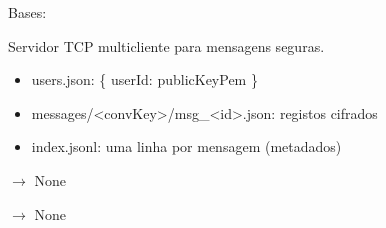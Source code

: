 \documentclass[letterpaper,10pt,english]{sphinxmanual}
\begin{document}
\begin{fulllineitems}
\label{\detokenize{modules:modules.messaging.MessagingServer}}
\pysigstartsignatures
\pysiglinewithargsret
{}
{\sphinxparamcomma {}\sphinxparamcomma {}}
{}
\pysigstopsignatures
\sphinxAtStartPar
Bases: 

\sphinxAtStartPar
Servidor TCP multi\sphinxhyphen{}cliente para mensagens seguras.
\begin{description}
\begin{itemize}
\item {} 
\sphinxAtStartPar
users.json: \{ userId: publicKeyPem \}

\item {} 
\sphinxAtStartPar
messages/\textless{}convKey\textgreater{}/msg\_\textless{}id\textgreater{}.json: registos cifrados

\item {} 
\sphinxAtStartPar
index.jsonl: uma linha por mensagem (metadados)

\end{itemize}

\end{description}

\begin{fulllineitems}
\label{\detokenize{modules:modules.messaging.MessagingServer.start}}
\pysigstartsignatures
\pysiglinewithargsret
{}
{}
{{ $\rightarrow$ None}}
\pysigstopsignatures
\end{fulllineitems}


\begin{fulllineitems}
\label{\detokenize{modules:modules.messaging.MessagingServer.stop}}
\pysigstartsignatures
\pysiglinewithargsret
{}
{}
{{ $\rightarrow$ None}}
\pysigstopsignatures
\end{fulllineitems}


\end{fulllineitems}
\end{document}
